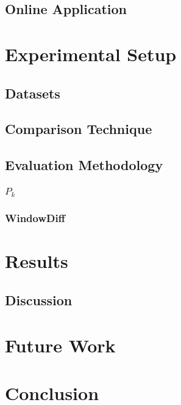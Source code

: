 \documentclass{sig-alternate}
\begin{document}
\subsection{Online Application}
\section{Experimental Setup}
\subsection{Datasets}
\subsection{Comparison Technique}
\subsection{Evaluation Methodology}
\subsubsection{\(P_k\)}
\subsubsection{WindowDiff}
\section{Results}
\subsection{Discussion}
\section{Future Work}
\section{Conclusion}
\end{document}
